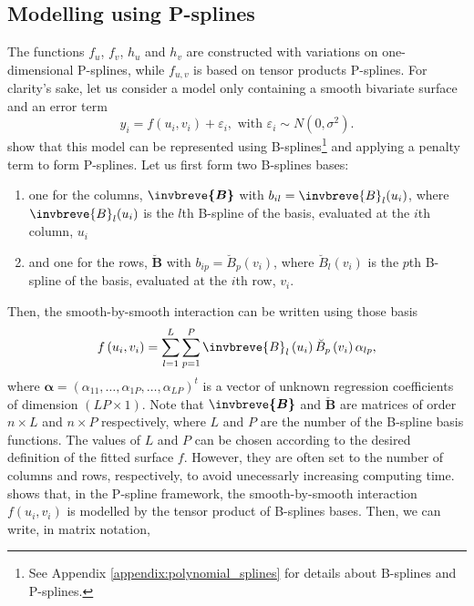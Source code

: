 \subsection{Modelling using P-splines}
The functions $f_u$, $f_v$, $h_u$ and $h_v$ are constructed  with variations on one-dimensional P-splines, while $f_{u,v}$ is based on tensor products P-splines. For clarity's sake, let us consider a model only containing a smooth bivariate surface and an error term
	\begin{equation}
	    y _ { i } = f \left( u _ { i } , v _ { i } \right) + \varepsilon _ { i } , \text { with } \varepsilon _ { i } \sim N 
	    \left( 0 , \sigma ^ { 2 } \right) \text{.}
		\label{eq:smooth_part_only_model}
	\end{equation}
\textcite{lee_efficient_2013} show that this model can be represented using B-splines\footnote{See Appendix \ref{appendix:polynomial_splines} for details about B-splines and P-splines.} and applying a penalty term to form P-splines. Let us first form two B-splines bases:
\begin{enumerate}
\item one for the columns, $\boldsymbol{\invbreve{B}}$ with $ b_{il}= \invbreve{B}_l(u_i)$, where $\invbreve{B}_l(u_i)$ is the $l$th B-spline of the basis, evaluated at the $i$th column, $u_i$
\item and one for the rows, $\boldsymbol{\breve{B}}$ with $ b_{ip}= \breve{B}_p(v_i)$, where $\breve{B}_l(v_i)$ is the $p$th B-spline of the basis, evaluated at the $i$th row, $v_i$.
\end{enumerate}
Then, the smooth-by-smooth interaction can be written using those basis
\begin{equation}
	f \left(u_{i},v_{i}\right)=\sum_{l=1}^{L}\sum_{p=1}^{P}\invbreve{B}_{l}\left(u_{i}\right)\breve{B}_{p}\left(v_{i}\right) 
	\alpha_{lp}\text{,}
\end{equation}
where $\boldsymbol{\alpha} = (\alpha_{11},\ldots,\alpha_{1P},\ldots,\alpha_{LP})^t$ is a vector of unknown regression coefficients of dimension $(LP \times 1)$. Note that $\boldsymbol{\invbreve{B}}$ and $\boldsymbol{\breve{B}}$ are matrices of order $n \times L$ and $n\times P$ respectively, where $L$ and $P$ are the number of the B-spline basis functions. The values of $L$ and $P$ can be chosen according to the desired definition of the fitted surface $f$. However, they are often set to the number of columns and rows, respectively, to avoid unecessarly increasing computing time. \textcite{dierckx_curve_1995} shows that, in the P-spline framework, the smooth-by-smooth interaction $f(u_i,v_i)$ is modelled by the tensor product of B-splines bases. Then, we can write, in matrix notation,
